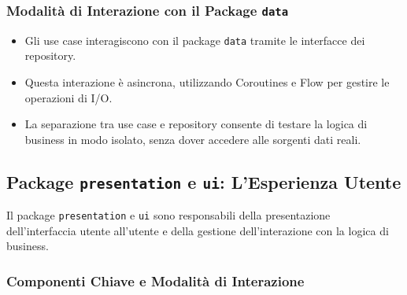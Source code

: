 \subsubsection{Modalità di Interazione con il Package \texttt{data}}

\begin{itemize}
    \item Gli use case interagiscono con il package \texttt{data} tramite le
    interfacce dei repository.
    \item Questa interazione è asincrona, utilizzando Coroutines e Flow per
    gestire le operazioni di I/O\@.
    \item La separazione tra use case e repository consente di testare la logica
    di business in modo isolato, senza dover accedere alle sorgenti dati reali.
\end{itemize}

\subsection{Package \texttt{presentation} e \texttt{ui}: L'Esperienza
Utente}\label{subsec:package-texttt{presentation}-e-texttt{ui}:-l'esperienza-utente}

Il package \texttt{presentation} e \texttt{ui} sono responsabili della
presentazione dell'interfaccia utente all'utente e della gestione
dell'interazione con la logica di business.

\subsubsection{Componenti Chiave e Modalità di Interazione}

